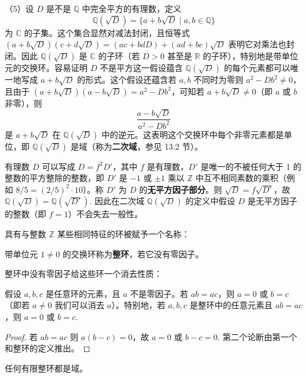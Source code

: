 \begin{example}
（5）设 \(D\) 是不是 \(\mathbb{Q}\) 中完全平方的有理数，定义
\[
\mathbb{Q}(\sqrt{D}) = \{a + b\sqrt{D} \mid a, b \in \mathbb{Q}\}
\]
为 \(\mathbb{C}\) 的子集。这个集合显然对减法封闭，且恒等式 \((a+b\sqrt{D})(c+d\sqrt{D}) = (ac+bdD) + (ad+bc)\sqrt{D}\) 表明它对乘法也封闭。因此 \(\mathbb{Q}(\sqrt{D})\) 是 \(\mathbb{C}\) 的子环（若 \(D > 0\) 甚至是 \(\mathbb{R}\) 的子环），特别地是带单位元的交换环。容易证明 \(D\) 不是平方这一假设蕴含 \(\mathbb{Q}(\sqrt{D})\) 的每个元素都可以唯一地写成 \(a + b\sqrt{D}\) 的形式。这个假设还蕴含若 \(a, b\) 不同时为零则 \(a^2 - Db^2 \neq 0\)，且由于 \((a+b\sqrt{D})(a-b\sqrt{D}) = a^2 - Db^2\)，可知若 \(a+b\sqrt{D} \neq 0\)（即 \(a\) 或 \(b\) 非零），则
\[
\frac{a - b\sqrt{D}}{a^2 - Db^2}
\]
是 \(a+b\sqrt{D}\) 在 \(\mathbb{Q}(\sqrt{D})\) 中的逆元。这表明这个交换环中每个非零元素都是单位，即 \(\mathbb{Q}(\sqrt{D})\) 是域（称为\textbf{二次域}，参见 13.2 节）。

有理数 \(D\) 可以写成 \(D = f^2 D'\)，其中 \(f\) 是有理数，\(D'\) 是唯一的不被任何大于 1 的整数的平方整除的整数，即 \(D'\) 是 \(-1\) 或 \(\pm 1\) 乘以 \(\mathbb{Z}\) 中互不相同素数的乘积（例如 \(8/5 = (2/5)^2 \cdot 10\)）。称 \(D'\) 为 \(D\) 的\textbf{无平方因子部分}。则 \(\sqrt{D} = f\sqrt{D'}\)，故 \(\mathbb{Q}(\sqrt{D}) = \mathbb{Q}(\sqrt{D'})\). 因此在二次域 \(\mathbb{Q}(\sqrt{D})\) 的定义中假设 \(D\) 是无平方因子的整数（即 \(f = 1\)）不会失去一般性。
\end{example}

具有与整数 \(\mathbb{Z}\) 某些相同特征的环被赋予一个名称：

\begin{definition}
带单位元 \(1 \neq 0\) 的交换环称为\textbf{整环}，若它没有零因子。
\end{definition}

整环中没有零因子给这些环一个消去性质：

\begin{proposition}\label{pro:7.2}
假设 \(a, b, c\) 是任意环的元素，且 \(a\) 不是零因子。若 \(ab = ac\)，则 \(a = 0\) 或 \(b = c\)（即若 \(a \neq 0\) 我们可以消去 \(a\)）。特别地，若 \(a, b, c\) 是整环中的任意元素且 \(ab = ac\)，则 \(a = 0\) 或 \(b = c\).
\end{proposition}

\begin{proof}
若 \(ab = ac\) 则 \(a(b-c) = 0\)，故 \(a = 0\) 或 \(b - c = 0\). 第二个论断由第一个和整环的定义推出。
\end{proof}

\begin{corollary}\label{cor:7.3}
任何有限整环都是域。
\end{corollary}

